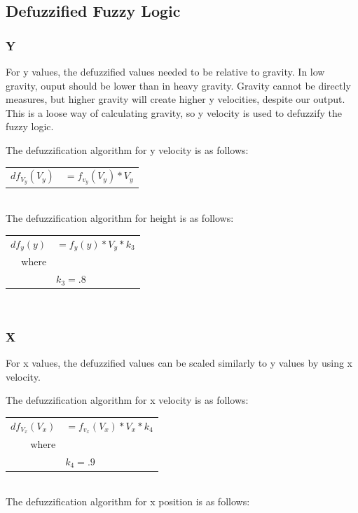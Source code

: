 \documentclass[12pt]{article}
\begin{document}
\subsection{Defuzzified Fuzzy Logic}
\subsubsection{Y}
For y values, the defuzzified values needed to be relative to gravity. In low gravity, ouput should be lower 
than in heavy gravity. Gravity cannot be directly measures, but higher gravity will create higher y velocities,
despite our output. This is a loose way of calculating gravity, so y velocity is used to defuzzify the fuzzy 
logic.

The defuzzification algorithm for y velocity is as follows:\\

\begin{tabular}{r l}
	$df_{V_y}(V_y)$	&	$ = f_{v_y}(V_y) * V_y $ \\		
\end{tabular} \\

The defuzzification algorithm for height is as follows:\\

\begin{tabular}{r l}
	$df_{y}(y)$		&	$ = f_{y}(y) * V_y  * k_3$ \\
	where		& \\
				&	$k_3 = .8$
\end{tabular} \\

\subsubsection{X}
For x values, the defuzzified values can be scaled similarly to y values by using x velocity.

The defuzzification algorithm for x velocity is as follows:\\

\begin{tabular}{r l}
	$df_{V_x}(V_x)$	&	$ = f_{v_x}(V_x) * V_x * k_4 $ \\		
	where		& \\
				&	$k_4 = .9$
\end{tabular} \\

The defuzzification algorithm for x position is as follows:\\
\end{document}
